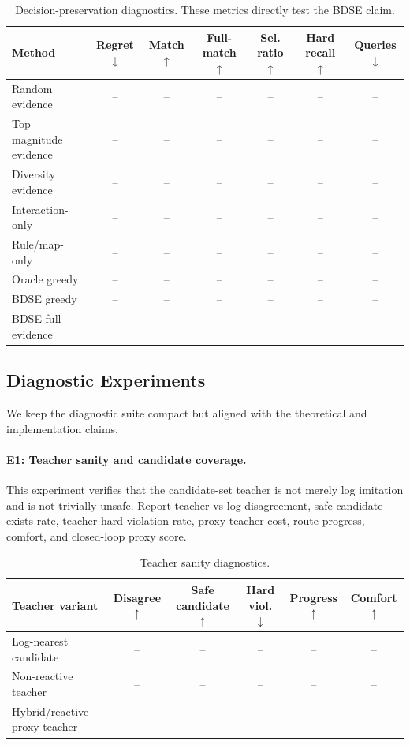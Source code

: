 \documentclass{article}
\begin{document}
\begin{table}[h]
\centering
\caption{Decision-preservation diagnostics. These metrics directly test the BDSE claim.}
\label{tab:decision_preservation}
\begin{tabular}{lcccccc}
\toprule
Method & Regret $\downarrow$ & Match $\uparrow$ & Full-match $\uparrow$ & Sel. ratio $\uparrow$ & Hard recall $\uparrow$ & Queries $\downarrow$\\
\midrule
Random evidence & -- & -- & -- & -- & -- & -- \\
Top-magnitude evidence & -- & -- & -- & -- & -- & -- \\
Diversity evidence & -- & -- & -- & -- & -- & -- \\
Interaction-only & -- & -- & -- & -- & -- & -- \\
Rule/map-only & -- & -- & -- & -- & -- & -- \\
Oracle greedy & -- & -- & -- & -- & -- & -- \\
BDSE greedy & -- & -- & -- & -- & -- & -- \\
BDSE full evidence & -- & -- & -- & -- & -- & -- \\
\bottomrule
\end{tabular}
\end{table}

\subsection{Diagnostic Experiments}
We keep the diagnostic suite compact but aligned with the theoretical and implementation claims.

\paragraph{E1: Teacher sanity and candidate coverage.}
This experiment verifies that the candidate-set teacher is not merely log imitation and is not trivially unsafe. Report teacher-vs-log disagreement, safe-candidate-exists rate, teacher hard-violation rate, proxy teacher cost, route progress, comfort, and closed-loop proxy score.
\begin{table}[h]
\centering
\caption{Teacher sanity diagnostics.}
\label{tab:teacher_sanity}
\begin{tabular}{lccccc}
\toprule
Teacher variant & Disagree $\uparrow$ & Safe candidate $\uparrow$ & Hard viol. $\downarrow$ & Progress $\uparrow$ & Comfort $\uparrow$\\
\midrule
Log-nearest candidate & -- & -- & -- & -- & -- \\
Non-reactive teacher & -- & -- & -- & -- & -- \\
Hybrid/reactive-proxy teacher & -- & -- & -- & -- & -- \\
\bottomrule
\end{tabular}
\end{table}
\end{document}
